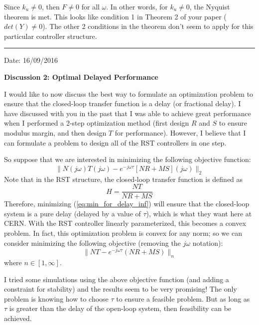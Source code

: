 \documentclass[12pt]{article}
\begin{document}
Since $k_u \neq 0$, then $F\neq 0$ for all $\omega$. In other words, for $k_u \neq 0$, the Nyquist theorem is met. This looks like condition 1 in Theorem 2 of your paper ($det(Y) \neq 0$). The other 2 conditions in the theorem don't seem to apply for this particular controller structure.

\hrule
\begin{flushright}
Date: 16/09/2016
\end{flushright}
\textbf{Discussion 2: Optimal Delayed Performance}

I would like to now discuss the best way to formulate an optimization problem to ensure that the closed-loop transfer function is a delay (or fractional delay). I have discussed with you in the past that I was able to achieve great performance when I performed a 2-step optimization method (first design $R$ and $S$ to ensure modulus margin, and then design $T$ for performance). However, I believe that I can formulate a problem to design all of the RST controllers in one step.

So suppose that we are interested in minimizing the following objective function:
\begin{equation} \label{eq:min_for_delay_inf}
\|N(j\omega)T(j\omega) - e^{-j\omega \tau }[NR+MS](j\omega)\|_2
\end{equation}
Note that in the RST structure, the closed-loop transfer function is defined as
\begin{equation}
H = \frac{NT}{NR+MS}
\end{equation}
Therefore, minimizing (\ref{eq:min_for_delay_inf}) will ensure that the closed-loop system is a pure delay (delayed by a value of $\tau$), which is what they want here at CERN. With the RST controller linearly parameterized, this becomes a convex problem. In fact, this optimization problem is convex for any norm; so we can consider minimizing the following objective (removing the $j\omega$ notation):
\begin{equation} \label{eq:min_for_delay}
\|NT - e^{-j\omega \tau }(NR+MS)\|_n
\end{equation}
where $n \in [1,\infty]$. 

I tried some simulations using the above objective function (and adding a constraint for stability) and the results seem to be very promising! The only problem is knowing how to choose $\tau$ to ensure a feasible problem. But as long as $\tau$ is greater than the delay of the open-loop system, then feasibility can be achieved. 
\end{document}
